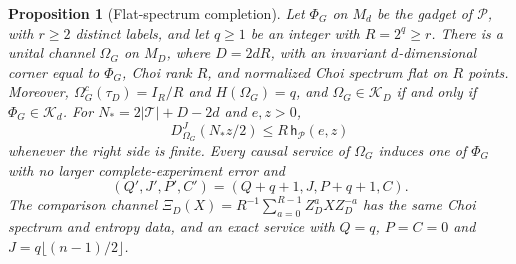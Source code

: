 \documentclass[11pt,a4paper]{article}
\theoremstyle{plain}
\newtheorem{proposition}[theorem]{Proposition}
\theoremstyle{definition}
\theoremstyle{remark}
\newcommand{\DChoi}{D^{J}}
\begin{document}
\begin{proposition}[Flat-spectrum completion]\label{prop:spectrum-completion}
Let $\Phi_G$ on $M_d$ be the gadget of $\mathcal P$, with $r\ge2$ distinct labels, and let $q\ge1$ be an integer with $R=2^q\ge r$. There is a unital channel
$\Omega_G$ on $M_D$, where $D=2dR$, with an invariant $d$-dimensional corner equal to $\Phi_G$, Choi rank $R$, and normalized Choi spectrum
flat on $R$ points. Moreover, $\Omega_G^c(\tau_D)=I_R/R$ and $H(\Omega_G)=q$, and
$\Omega_G\in\mathcal K_D$ if and only if $\Phi_G\in\mathcal K_d$.
For $N_*=2|\mathcal T|+D-2d$ and $e,z>0$,
\begin{equation}\label{eq:completion-profile}
\DChoi_{\Omega_G}(N_*z/2)\le R\,\mathsf h_{\mathcal P}(e,z)
\end{equation}
whenever the right side is finite. Every causal service of $\Omega_G$ induces one of $\Phi_G$ with no larger complete-experiment error and
\[
(Q',J',P',C')=(Q+q+1,J,P+q+1,C).
\]
The comparison channel $\Xi_D(X)=R^{-1}\sum_{a=0}^{R-1}Z_D^aXZ_D^{-a}$ has the same Choi spectrum and entropy data, and an exact service
with $Q=q$, $P=C=0$ and $J=q\lfloor(n-1)/2\rfloor$.
\end{proposition}
\end{document}
